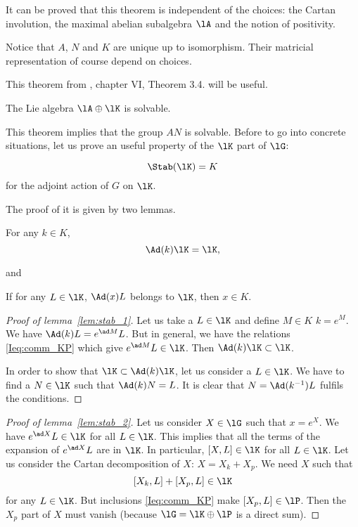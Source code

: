 \begin{remark}
It can be proved that this theorem is independent of the choices: the Cartan involution, the maximal abelian subalgebra $\lA$ and the notion of positivity.
\end{remark}
Notice that $A$, $N$ and $K$ are unique up to isomorphism. Their matricial representation of course depend on choices.

This theorem from \cite{Helgason}, chapter VI, Theorem 3.4. will be useful.

\begin{theorem}
The Lie algebra $\lA\oplus\lK$ is solvable.
\end{theorem}
This theorem implies that the group $AN$ is solvable. Before to go into concrete situations, let us prove an useful property of the $\lK$ part of $\lG$:

\begin{theorem}
\[
      \Stab(\lK)=K
\]
 for the adjoint action of $G$ on $\lK$.
\label{tho:Stab_K}
\end{theorem}
The proof of it is given by two lemmas. \cite{Humphreys}

\begin{lemma}
For any $k\in K$,
\[
   \Ad(k)\lK=\lK,
\]
\label{lem:stab_1}
\end{lemma}
and
\begin{lemma}
 If for any $L\in\lK$, $\Ad(x)L$ belongs to $\lK$, then $x\in K$.
\label{lem:stab_2}
\end{lemma}

\begin{proof}[Proof of lemma~\ref{lem:stab_1}]
   Let us take a $L\in\lK$ and define $M\in K$ $k=e^M$. We have $\Ad(k)L=e^{\ad M}L$. But in general, we have the relations \eqref{Ieq:comm_KP} which give $e^{\ad M}L\in\lK$. Then $\Ad(k)\lK\subset\lK$.

   In order to show that $\lK\subset\Ad(k)\lK$, let us consider a $L\in\lK$. We have to find a $N\in\lK$ such that $\Ad(k)N=L$. It is clear that $N=\Ad(k^{-1})L$ fulfils the conditions.
\end{proof}

\begin{proof}[Proof of lemma~\ref{lem:stab_2}]
Let us consider $X\in\lG$ such that $x=e^X$. We have $e^{\ad X}L\in\lK$ for all $L\in\lK$. This implies that all the terms of the expansion of $e^{\ad X}L$ are in $\lK$. In particular, $[X,L]\in\lK$ for all $L\in\lK$. Let us consider the Cartan decomposition of $X$: $X=X_k+X_p$. We need $X$ such that
\[
   [X_k,L]+[X_p,L]\in\lK
\]
for any $L\in\lK$. But inclusions \eqref{Ieq:comm_KP} make $[X_p,L]\in\lP$. Then the $X_p$ part of $X$ must vanish (because $\lG=\lK\oplus\lP$ is a direct sum).
\end{proof}

